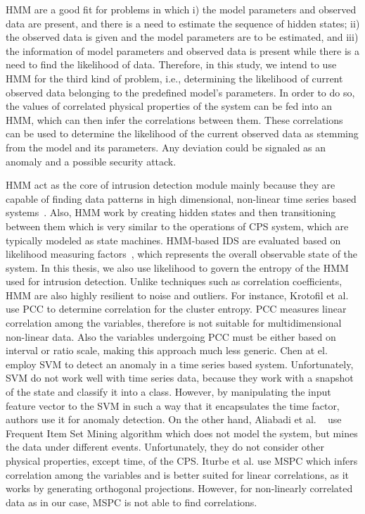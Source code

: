 \ac{HMM} are a good fit for problems in which i) the model parameters and observed data are present, and there is a need to estimate the sequence of hidden states; ii) the observed data is given and the model parameters are to be estimated, and iii) the information of model parameters and observed data is present while there is a need to find the likelihood of data. Therefore, in this study, we intend to use \ac{HMM} for the third kind of problem, i.e., determining the likelihood of current observed data belonging to the predefined model's parameters. In order to do so, the values of correlated physical properties of the system can be fed into an \ac{HMM}, which can then infer the correlations between them. These correlations can be used to determine the likelihood of the current observed data as stemming from the model and its parameters. Any deviation could be signaled as an anomaly and a possible security attack.

\ac{HMM} act as the core of intrusion detection module mainly because they are capable of finding data patterns in high dimensional, non-linear time series based systems~\cite{tan2008hidden}. Also, \ac{HMM} work by creating hidden states and then transitioning between them which is very similar to the operations of \ac{CPS} system, which are typically modeled as state machines. \ac{HMM}-based \ac{IDS} are  evaluated based on likelihood measuring factors~\cite{tan2008hidden, jadhav2011anomaly}, which represents the overall observable state of the system. In this thesis, we also use likelihood to govern the entropy of the \ac{HMM} used for intrusion detection. 
Unlike techniques such as correlation coefficients, \ac{HMM} are also highly resilient to noise and outliers. 
For instance, Krotofil et al.~\cite{krotofil2015process} use \acf{PCC} to determine correlation for the cluster entropy. \ac{PCC} measures linear correlation among the variables, therefore is not suitable for multidimensional non-linear data. Also the variables undergoing \ac{PCC} must be either based on interval or ratio scale, making this approach much less generic. Chen at el.  \cite{chen2018learning} employ \ac{SVM} to detect an anomaly in a time series based system. Unfortunately, \ac{SVM} do not work well with time series data, because they work with a snapshot of the state and classify it into a class. However, by manipulating the input feature vector to the \ac{SVM} in such a way that it encapsulates the time factor, authors use it for anomaly detection. On the other hand, Aliabadi et al. ~\cite{aliabadi2017artinali} use Frequent Item Set Mining algorithm which does not model the system, but mines the data under different events. Unfortunately, they do not consider other physical properties, except time, of the \ac{CPS}. Iturbe et al. \cite{iturbe2017feasibility} use \ac{MSPC} which infers correlation among the variables and is better suited for linear correlations, as it works by generating orthogonal projections. However, for non-linearly correlated data as in our case, \ac{MSPC} is not able to find correlations.



